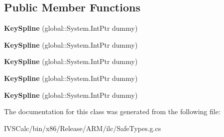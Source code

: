 \subsection*{Public Member Functions}
\begin{DoxyCompactItemize}
\item 
\mbox{\label{class_windows_1_1_u_i_1_1_xaml_1_1_media_1_1_animation_1_1_key_spline_aa9812a8a06bad7e7b1b02192e893454a}} 
{\bfseries Key\+Spline} (global\+::\+System.\+Int\+Ptr dummy)
\item 
\mbox{\label{class_windows_1_1_u_i_1_1_xaml_1_1_media_1_1_animation_1_1_key_spline_aa9812a8a06bad7e7b1b02192e893454a}} 
{\bfseries Key\+Spline} (global\+::\+System.\+Int\+Ptr dummy)
\item 
\mbox{\label{class_windows_1_1_u_i_1_1_xaml_1_1_media_1_1_animation_1_1_key_spline_aa9812a8a06bad7e7b1b02192e893454a}} 
{\bfseries Key\+Spline} (global\+::\+System.\+Int\+Ptr dummy)
\item 
\mbox{\label{class_windows_1_1_u_i_1_1_xaml_1_1_media_1_1_animation_1_1_key_spline_aa9812a8a06bad7e7b1b02192e893454a}} 
{\bfseries Key\+Spline} (global\+::\+System.\+Int\+Ptr dummy)
\item 
\mbox{\label{class_windows_1_1_u_i_1_1_xaml_1_1_media_1_1_animation_1_1_key_spline_aa9812a8a06bad7e7b1b02192e893454a}} 
{\bfseries Key\+Spline} (global\+::\+System.\+Int\+Ptr dummy)
\end{DoxyCompactItemize}


The documentation for this class was generated from the following file\+:\begin{DoxyCompactItemize}
\item 
I\+V\+S\+Calc/bin/x86/\+Release/\+A\+R\+M/ilc/Safe\+Types.\+g.\+cs\end{DoxyCompactItemize}
